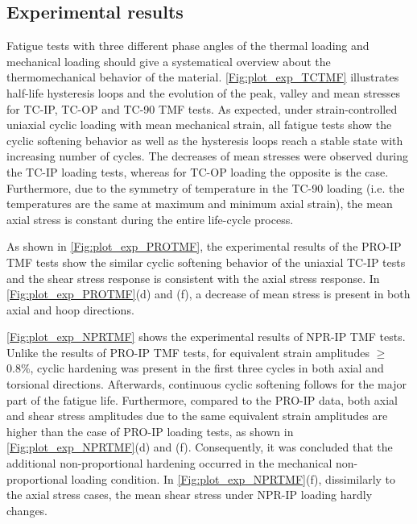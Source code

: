 \subsection{Experimental results}
\noindent
Fatigue tests with three different phase angles of the thermal loading and mechanical loading should give a systematical overview about the thermomechanical behavior of the material. \ref{Fig:plot_exp_TCTMF} illustrates half-life hysteresis loops and the evolution of the peak, valley and mean stresses for TC-IP, TC-OP and TC-90 TMF tests. As expected, under strain-controlled uniaxial cyclic loading with mean mechanical strain, all fatigue tests show the cyclic softening behavior as well as the hysteresis loops reach a stable state with increasing number of cycles. The decreases of mean stresses were observed during the TC-IP loading tests, whereas for TC-OP loading the opposite is the case. Furthermore, due to the symmetry of temperature in the TC-90 loading (i.e. the temperatures are the same at maximum and minimum axial strain), the mean axial stress is constant during the entire life-cycle process.

As shown in \ref{Fig:plot_exp_PROTMF}, the experimental results of the PRO-IP TMF tests show the similar cyclic softening behavior of the uniaxial TC-IP tests and the shear stress response is consistent with the axial stress response. In \ref{Fig:plot_exp_PROTMF}(d) and (f), a decrease of mean stress is present in both axial and hoop directions.

\ref{Fig:plot_exp_NPRTMF} shows the experimental results of NPR-IP TMF tests. Unlike the results of PRO-IP TMF tests, for equivalent strain amplitudes $\geqslant$0.8\%, cyclic hardening was present in the first three cycles in both axial and torsional directions. Afterwards, continuous cyclic softening follows for the major part of the fatigue life. Furthermore, compared to the PRO-IP data, both axial and shear stress amplitudes due to the same equivalent strain amplitudes are higher than the case of PRO-IP loading tests, as shown in \ref{Fig:plot_exp_NPRTMF}(d) and (f). Consequently, it was concluded that the additional non-proportional hardening occurred in the mechanical non-proportional loading condition. In \ref{Fig:plot_exp_NPRTMF}(f), dissimilarly to the axial stress cases, the mean shear stress under NPR-IP loading hardly changes.


